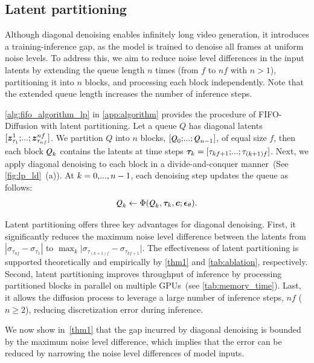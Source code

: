 \subsection{Latent partitioning}
\label{subsec:latent_partitioning}


Although diagonal denoising enables infinitely long video generation, it introduces a training-inference gap, as the model is trained to denoise all frames at uniform noise levels. 
To address this, we aim to reduce noise level differences in the input latents by extending the queue length $n$ times (from $f$ to $nf$ with $n > 1$), partitioning it into $n$ blocks, and processing each block independently. 
Note that the extended queue length increases the number of inference steps.

\cref{alg:fifo_algorithm_lp} in \cref{app:algorithm} provides the procedure of FIFO-Diffusion with latent partitioning.
Let a queue $Q$ has diagonal latents $[\gz_{\tau_1}^1;\text{\myldots};\gz_{\tau_{nf}}^{nf}]$.
We partition $Q$ into $n$ blocks, $[\Q_0;\text{\myldots};\Q_{n-1}]$, of equal size $f$, then each block $\Q_k$ contains the latents at time steps $\bm{\tau}_k = [ \tau_{kf+1}; \text{\myldots}; \tau_{(k+1)f}]$.
Next, we apply diagonal denoising to each block in a divide-and-conquer manner~(See \cref{fig:lp_ld}~(a)).
At $k=0,\text{\mycdots},n-1$, each denoising step updates the queue as follows:
\begin{align} \label{eq:lp}
    \Q_k \leftarrow \Phi(\Q_k, \bm{\tau}_k, \bm{c}; \bm{\epsilon}_\theta).
\end{align}


Latent partitioning offers three key advantages for diagonal denoising.
First, it significantly reduces the maximum noise level difference between the latents from $|\sigma_{\tau_{nf}}-\sigma_{\tau_{1}}|$ to $\max_{k}{|\sigma_{\tau_{(k+1)f}}-\sigma_{\tau_{kf+1}}}|$.
The effectiveness of latent partitioning is supported theoretically and empirically by \cref{thm1} and \cref{tab:ablation}, respectively.
Second, latent partitioning improves throughput of inference by processing partitioned blocks in parallel on multiple GPUs~(see \cref{tab:memory_time}).
Last, it allows the diffusion process to leverage a large number of inference steps, $nf$ ($n \ge 2$), reducing discretization error during inference.

We now show in~\cref{thm1} that the gap incurred by diagonal denoising is bounded by the maximum noise level difference, which implies that the error can be reduced by narrowing the noise level differences of model inputs.

